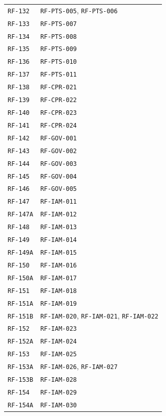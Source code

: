 \documentclass[10pt,letterpaper]{article}
\begin{document}
\begin{longtable}{P{3.0cm}P{10.6cm}}
\texttt{RF-132} & \texttt{RF-PTS-005}, \texttt{RF-PTS-006}\\
\texttt{RF-133} & \texttt{RF-PTS-007}\\
\texttt{RF-134} & \texttt{RF-PTS-008}\\
\texttt{RF-135} & \texttt{RF-PTS-009}\\
\texttt{RF-136} & \texttt{RF-PTS-010}\\
\texttt{RF-137} & \texttt{RF-PTS-011}\\
\texttt{RF-138} & \texttt{RF-CPR-021}\\
\texttt{RF-139} & \texttt{RF-CPR-022}\\
\texttt{RF-140} & \texttt{RF-CPR-023}\\
\texttt{RF-141} & \texttt{RF-CPR-024}\\
\texttt{RF-142} & \texttt{RF-GOV-001}\\
\texttt{RF-143} & \texttt{RF-GOV-002}\\
\texttt{RF-144} & \texttt{RF-GOV-003}\\
\texttt{RF-145} & \texttt{RF-GOV-004}\\
\texttt{RF-146} & \texttt{RF-GOV-005}\\
\texttt{RF-147} & \texttt{RF-IAM-011}\\
\texttt{RF-147A} & \texttt{RF-IAM-012}\\
\texttt{RF-148} & \texttt{RF-IAM-013}\\
\texttt{RF-149} & \texttt{RF-IAM-014}\\
\texttt{RF-149A} & \texttt{RF-IAM-015}\\
\texttt{RF-150} & \texttt{RF-IAM-016}\\
\texttt{RF-150A} & \texttt{RF-IAM-017}\\
\texttt{RF-151} & \texttt{RF-IAM-018}\\
\texttt{RF-151A} & \texttt{RF-IAM-019}\\
\texttt{RF-151B} & \texttt{RF-IAM-020}, \texttt{RF-IAM-021}, \texttt{RF-IAM-022}\\
\texttt{RF-152} & \texttt{RF-IAM-023}\\
\texttt{RF-152A} & \texttt{RF-IAM-024}\\
\texttt{RF-153} & \texttt{RF-IAM-025}\\
\texttt{RF-153A} & \texttt{RF-IAM-026}, \texttt{RF-IAM-027}\\
\texttt{RF-153B} & \texttt{RF-IAM-028}\\
\texttt{RF-154} & \texttt{RF-IAM-029}\\
\texttt{RF-154A} & \texttt{RF-IAM-030}\\

\end{longtable}
\end{document}
